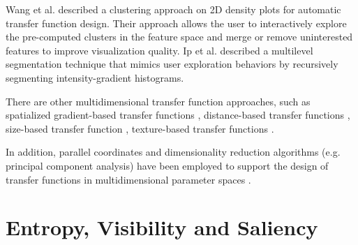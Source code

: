 \documentclass{egpubl}
\begin{document}
Wang et al. \cite{wang_automating_2012} described a clustering approach on 2D density plots for automatic transfer function design. Their approach allows the user to interactively explore the pre-computed clusters in the feature space and merge or remove uninterested features to improve visualization quality.
Ip et al. \cite{ip_hierarchical_2012} described a multilevel segmentation technique that mimics user exploration behaviors by recursively segmenting intensity-gradient histograms.

There are other multidimensional transfer function approaches, such as spatialized gradient-based transfer functions \cite{roettger_spatialized_2005}, distance-based transfer functions \cite{tappenbeck_distance-based_2006}, size-based transfer function \cite{correa_size-based_2008}, texture-based transfer functions \cite{caban_texture-based_2008} \cite{alper_selver_exploring_2015}.

In addition, parallel coordinates and dimensionality reduction algorithms (e.g. principal component analysis) have been employed to support the design of transfer functions in multidimensional parameter spaces \cite{zhao_multi-dimensional_2010} \cite{guo_multi-dimensional_2011} \cite{kim_dimensionality_2010}.

\section{Entropy, Visibility and Saliency}
\end{document}
